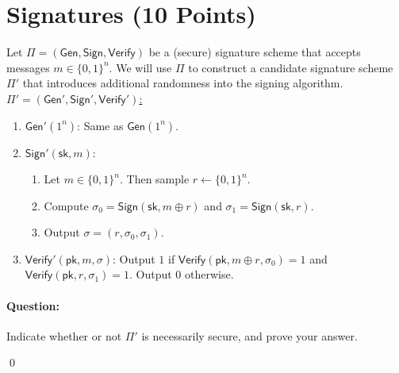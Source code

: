\documentclass[11pt]{article}
\numberwithin{equation}{section}
\newcommand{\Gen}{\mathsf{Gen}}
\newcommand{\Sign}{\mathsf{Sign}}
\newcommand{\Verify}{\mathsf{Verify}}
\newcommand{\pk}{\mathsf{pk}}
\newcommand{\sk}{\mathsf{sk}}
\newcommand{\bin}{\{0,1\}}
\newcommand{\bit}{\bin}
\newenvironment{solution}{\color{blue}\noindent{\bf Solution}\hspace*{1em}}{\qed\medskip}
\begin{document}
\section{Signatures (10 Points)}
Let $\Pi = (\Gen, \Sign, \Verify)$ be a (secure) signature scheme that accepts messages $m \in \bit^n$. We will use $\Pi$ to construct a candidate signature scheme $\Pi'$ that introduces additional randomness into the signing algorithm.\\

\noindent\underline{$\Pi' = (\Gen', \Sign', \Verify')$:}
    \begin{enumerate}
        \item $\Gen'(1^n)$: Same as $\Gen(1^n)$.
        \item $\Sign'(\sk, m)$: 
        \begin{enumerate}
            \item Let $m \in \bit^n$. Then sample $r \leftarrow \bit^n$.
            \item Compute $\sigma_0 = \Sign(\sk, m \oplus r)$ and $\sigma_1 = \Sign(\sk, r)$.
            \item Output $\sigma = (r, \sigma_0, \sigma_1)$.
        \end{enumerate}
        \item $\Verify'(\pk, m, \sigma)$: Output $1$ if $\Verify(\pk, m \oplus r, \sigma_0) = 1$ and $\Verify(\pk, r, \sigma_1) = 1$. Output $0$ otherwise.
    \end{enumerate}

\paragraph{Question:} Indicate whether or not $\Pi'$ is necessarily secure, and prove your answer.\\

\begin{solution}

\end{solution}
\end{document}
